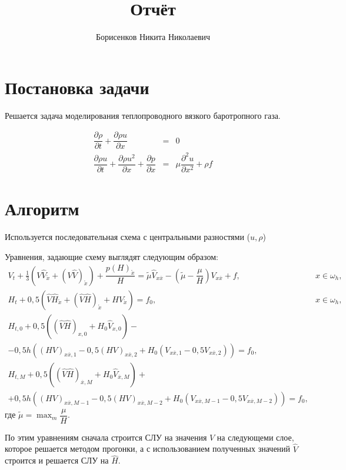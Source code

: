 \documentclass[12pt,a4paper]{article}
\author{Борисенков Никита Николаевич}
\title{Отчёт}
\newcommand{\xo}{\mathring{x}}
\newcommand{\xx}{x\overline{x}}
\newcommand{\pd}[2]{\dfrac{\partial #1}{\partial #2}}
\begin{document}
\maketitle
\tableofcontents
\newpage
\section{Постановка задачи}

Решается задача моделирования теплопроводного вязкого баротропного газа.

$$
\begin{array}{rcl}
    \pd{\rho}{t} + \pd{\rho u}{x} & = & 0\\
    \pd{\rho u}{t} + \pd{\rho u^2}{x} + \pd{p}{x} & = & \mu\pd{^2 u}{x^2} + \rho f
\end{array}
$$

\section{Алгоритм}

Используется последовательная схема с центральными разностями ($u, \rho$)

Уравнения, задающие схему выглядят следующим образом:
$$
\begin{array}{lc}
    V_t + \frac13 \left( V\hat{V}_{\xo} + ( V\hat{V} )_{\xo} \right) + \dfrac{p\left(H\right)_{\xo}}{H} = \tilde{\mu}\hat{V}_{\xx} - \left( \tilde{\mu} - \dfrac{\mu}{H} \right)V_{\xx} + f, & x \in \omega_h, \\

    H_t + 0,\!5 \left(  \hat{V}\hat{H}_{\xo} + (\hat{V}\hat{H})_{\xo} + H\hat{V}_{\xo}\right) = f_0, & x \in \omega_h, \\

    H_{t,0} + 0,\!5\left((\hat{V}\hat{H})_{x,0} + H_0\hat{V}_{x,0}\right) - & \\
    - 0,\!5h\left(\left(HV\right)_{\xx,1} - 0,\!5\left(HV\right)_{\xx,2} + H_0\left(V_{\xx,1} - 0,\!5V_{\xx,2}\right)\right) = f_0, & \\

    H_{t,M} + 0,\!5\left((\hat{V}\hat{H})_{\overline{x},M} + H_0\hat{V}_{\overline{x},M}\right) + & \\
    + 0,\!5h\left(\left(HV\right)_{\xx,M-1} - 0,\!5\left(HV\right)_{\xx,M-2} + H_0\left(V_{\xx,M-1} - 0,\!5V_{\xx,M-2}\right)\right) = f_0, & 
\end{array}
$$
где $\tilde{\mu} = \displaystyle\max_{m} \dfrac{\mu}{H}$.

По этим уравнениям сначала строится СЛУ на значения $V$ на следующеми слое, которое решается методом прогонки, а с использованием полученных значений $\hat{V}$ строится и решается СЛУ на $\hat{H}$.
\end{document}
